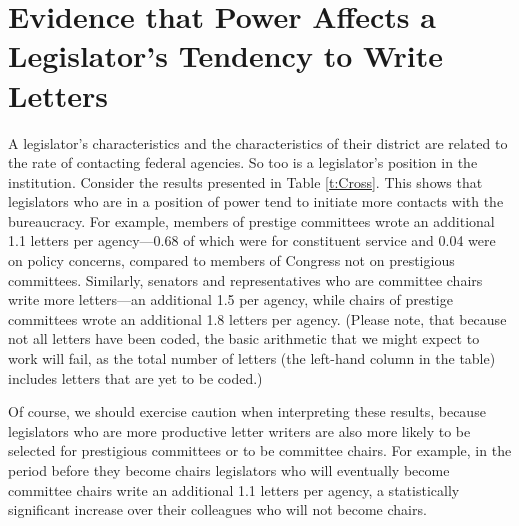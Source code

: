 \documentclass{article}
\begin{document}








\section{Evidence that Power Affects a Legislator's Tendency to Write Letters}




A legislator's characteristics and the characteristics of their district are related to the rate of contacting federal agencies.  So too is a legislator's position in the institution.  Consider the results presented in Table \ref{t:Cross}.  This shows that legislators who are in a position of power tend to initiate more contacts with the bureaucracy.  For example, members of prestige committees wrote an additional 1.1 letters per agency---0.68 of which were for constituent service and 0.04 were on policy concerns, compared to members of Congress not on prestigious committees.  Similarly, senators and representatives who are committee chairs write more letters---an additional 1.5 per agency, while chairs of prestige committees wrote an additional 1.8 letters per agency.  (Please note, that because not all letters have been coded, the basic arithmetic that we might expect to work will fail, as the total number of letters (the left-hand column in the table) includes letters that are yet to be coded.)

Of course, we should exercise caution when interpreting these results, because legislators who are more productive letter writers are also more likely to be selected for prestigious committees or to be committee chairs.  For example, in the period before they become chairs legislators who will eventually become committee chairs write an additional 1.1 letters per agency, a statistically significant increase over their colleagues who will not become chairs.  
\end{document}
